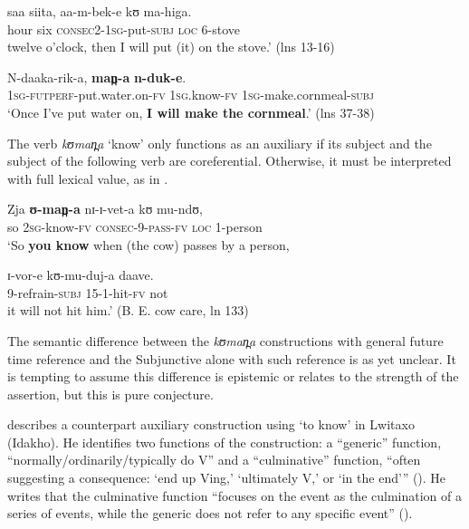 \documentclass[output=paper]{langsci/langscibook}
\begin{document}
\gll saa   siita,   aa-m-bek-e       kʊ   ma-higa. \\
hour  six  \textsc{consec2-1sg}-put-\textsc{subj}  \textsc{loc}  6-stove \\
\glt twelve o'clock, then I will put (it) on the stove.’ (lns 13-16)
\z 

\ea\label{ex:sarvasy:24}
\gll N-daaka-rik-a,         \textbf{man̪-a}     \textbf{n-duk-e}. \\
\textsc{1sg-futperf}-put.water.on-\textsc{fv}  1\textsc{sg.}know-\textsc{fv}    \textsc{1sg}-make.cornmeal-\textsc{subj} \\
\glt ‘Once I've put water on, \textbf{I will make the cornmeal}.’ (lns 37-38)
\z

The verb \textit{kʊman̪a} ‘know’ only functions as an auxiliary if its subject and the subject of the following verb are coreferential. Otherwise, it must be interpreted with full lexical value, as in .

\ea\label{ex:sarvasy:25}
\gll Zja   \textbf{ʊ-man̪-a}     nɪ-ɪ-vet-a     kʊ     mu-ndʊ, \\
so  2\textsc{sg-}know\textsc{-fv}  \textsc{consec}-9-\textsc{pass}-\textsc{fv}   \textsc{loc}  1-person \\
\glt ‘So \textbf{you know} when (the cow) passes by a person,

\gll ɪ-vor-e     kʊ-mu-duj-a   daave. \\
9-refrain-\textsc{subj}  15-1-hit-\textsc{fv}  not \\
\glt it will not hit him.’ (B. E. cow care, ln 133)
\z

The semantic difference between the \textit{kʊman̪a} constructions with general future time reference and the Subjunctive alone with such reference is as yet unclear. It is tempting to assume this difference is epistemic or relates to the strength of the assertion, but this is pure conjecture.

\citet{Botne2009} describes a counterpart auxiliary construction using ‘to know’ in Lwitaxo (Idakho). He identifies two functions of the construction: a “generic” function, “normally/ordinarily/typically do V” and a “culminative” function, “often suggesting a consequence: ‘end up Ving,’ ‘ultimately V,’ or ‘in the end’” (\citeyear[93]{Botne2009}). He writes that the culminative function “focuses on the event as the culmination of a series of events, while the generic does not refer to any specific event” (\citeyear[95]{Botne2009}).
\end{document}
